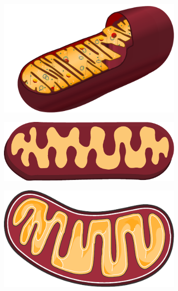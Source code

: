 \begin{figure}[h]
    \centering
    \begin{subfigure}[t]{0.3\linewidth}
        \includegraphics[width=\textwidth]{chapters/images/animal_mitochondrion}
    \end{subfigure}
    \begin{subfigure}[t]{0.3\linewidth}
        \includegraphics[width=\textwidth]{chapters/images/mitochondrium-rod}
    \end{subfigure}
    \begin{subfigure}[t]{0.3\linewidth}
        \includegraphics[width=\textwidth]{chapters/images/mitochondrium-servier}
    \end{subfigure}
\end{figure}
